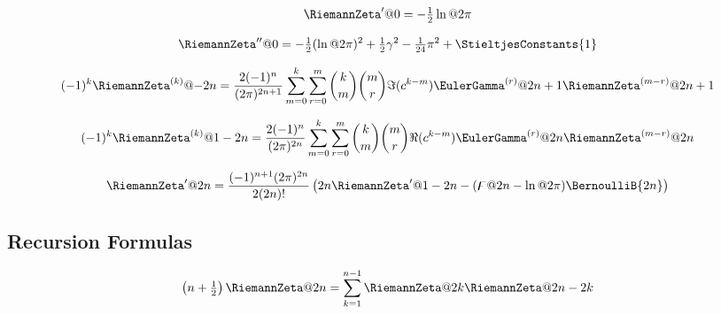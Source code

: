 \documentclass{article}
\begin{document}

\begin{equation}\label{eq:ZE.INA.DER1}%
  \RiemannZeta'@{0} = - \tfrac{1}{2} \ln@{2\cpi}
\end{equation}

\begin{equation}\label{eq:ZE.INA.DER2}%
  \RiemannZeta''@{0}
  = -\tfrac{1}{2} (\ln@{2\cpi})^2
  + \tfrac{1}{2} \EulerConstant^2
  - \tfrac{1}{24} \cpi^2 + \StieltjesConstants{1} 
\end{equation}

\begin{equation}\label{eq:ZE.INA.DER3}%
  \opminus^k \RiemannZeta^{(k)}@{-2n}
  = \frac{2 \opminus^n}{(2\cpi)^{2n+1}}
    \sum_{m=0}^k \sum_{r=0}^m
        \binom{k}{m} \binom{m}{r} \imagpart{(c^{k-m})}
        \* \EulerGamma^{(r)}@{2n+1} \RiemannZeta^{(m-r)}@{2n+1}
\end{equation}

\begin{equation}\label{eq:ZE.INA.DER4}%
  \opminus^k \RiemannZeta^{(k)}@{1-2n}
  = \frac{2 \opminus^n}{(2\cpi)^{2n}}
    \sum_{m=0}^k \sum_{r=0}^m
        \binom{k}{m} \binom{m}{r} \realpart{(c^{k-m})}
        \* \EulerGamma^{(r)}@{2n} \RiemannZeta^{(m-r)}@{2n}
\end{equation}

\begin{equation}\label{eq:ZE.INA.DER5}%
  \RiemannZeta'@{2n}
  = \frac{\opminus^{n+1} (2\cpi)^{2n}}{2(2n)!}
    \left( 2n \RiemannZeta'@{1-2n}
         - (\digamma@{2n} - \ln@{2\cpi}) \BernoulliB{2n}
    \right)
\end{equation}

\subsection{Recursion Formulas}\label{sec:ZE.INA.REC}


\begin{equation}\label{eq:ZE.INA.REC2}%
  \left( n + \tfrac{1}{2} \right) \RiemannZeta@{2n}
  = \sum_{k=1}^{n-1} \RiemannZeta@{2k} \RiemannZeta@{2n-2k}
\end{equation}
\end{document}
